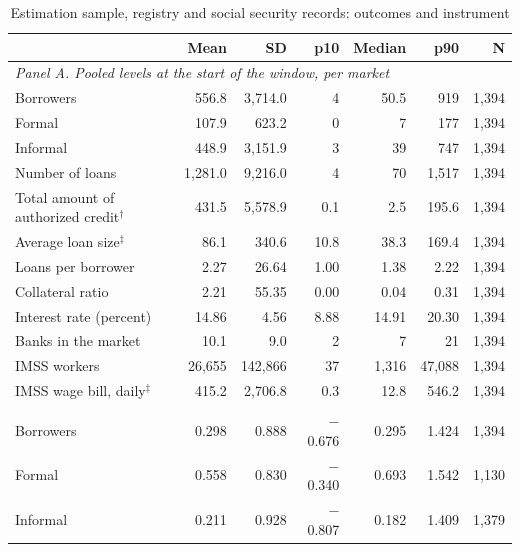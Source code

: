 \documentclass[12pt]{article}
\begin{document}
\begin{table}[H]
    \centering
    \caption{Estimation sample, registry and social security records: outcomes and instrument}
    \label{tab:desc_sample_registry}
    \begin{threeparttable}
        \small
        \setlength{\tabcolsep}{5pt}
        \renewcommand{\arraystretch}{0.9}
        \begin{tabular}{l r r r r r r}
            \toprule
             & Mean & SD & p10 & Median & p90 & N \\
            \midrule
            \multicolumn{7}{l}{\textit{Panel A. Pooled levels at the start of the window, per market}} \\
            Borrowers & 556.8 & 3,714.0 & 4 & 50.5 & 919 & 1,394 \\
            \quad Formal & 107.9 & 623.2 & 0 & 7 & 177 & 1,394 \\
            \quad Informal & 448.9 & 3,151.9 & 3 & 39 & 747 & 1,394 \\
            Number of loans & 1,281.0 & 9,216.0 & 4 & 70 & 1,517 & 1,394 \\
            Total amount of authorized credit$^{\dagger}$ & 431.5 & 5,578.9 & 0.1 & 2.5 & 195.6 & 1,394 \\
            Average loan size$^{\ddagger}$ & 86.1 & 340.6 & 10.8 & 38.3 & 169.4 & 1,394 \\
            Loans per borrower & 2.27 & 26.64 & 1.00 & 1.38 & 2.22 & 1,394 \\
            Collateral ratio & 2.21 & 55.35 & 0.00 & 0.04 & 0.31 & 1,394 \\
            Interest rate (percent) & 14.86 & 4.56 & 8.88 & 14.91 & 20.30 & 1,394 \\
            Banks in the market & 10.1 & 9.0 & 2 & 7 & 21 & 1,394 \\
            IMSS workers & 26,655 & 142,866 & 37 & 1,316 & 47,088 & 1,394 \\
            IMSS wage bill, daily$^{\ddagger}$ & 415.2 & 2,706.8 & 0.3 & 12.8 & 546.2 & 1,394 \\
            \addlinespace[3pt]
            \multicolumn{7}{l}{\textit{Panel B. Five year changes, log points}} \\
            Borrowers & 0.298 & 0.888 & $-$0.676 & 0.295 & 1.424 & 1,394 \\
            \quad Formal & 0.558 & 0.830 & $-$0.340 & 0.693 & 1.542 & 1,130 \\
            \quad Informal & 0.211 & 0.928 & $-$0.807 & 0.182 & 1.409 & 1,379 \\

\end{tabular}
\end{threeparttable}
\end{table}
\end{document}
